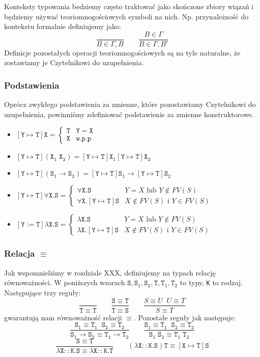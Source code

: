 \documentclass[11pt,leqno]{article}
\begin{document}
Konteksty typowania bedziemy często traktować jako skończone zbiory wiązań i będziemy
używać teoriomnogościowych symboli na nich. Np. przynależność do kontekstu formalnie
definiujemy jako:
\[
	\frac{}{B \in \Gamma,B}
	\qquad
	\frac{B \in \Gamma}{B \in \Gamma,B'}
\]
Definicje pozostałych operacji teoriomnogościowych są na tyle naturalne, że zostawiamy
je Czytelnikowi do uzupełnienia.


\subsubsection{Podstawienia}
Oprócz zwykłego podstawienia za zmienne, które pozostawiamy Czytelnikowi do uzupełnienia, powinniśmy zdefiniować podstawienie za zmienne konstruktorowe.

    \begin{itemize}
        \item $\mathtt{[Y \mapsto T]X = \begin{cases}  \texttt{T} & Y=X \\ \texttt{X} & \text{w.p.p} \end{cases}}$
        \item $\mathtt{[Y \mapsto T](X_1 \; X_2)  = [Y \mapsto T]X_1 [Y \mapsto T] X_2 }$
        \item $\mathtt{[Y \mapsto T](S_1 \rightarrow S_2) = [Y \mapsto T]S_1 \rightarrow [Y \mapsto T]S_2} $
        \item $\mathtt{[Y \mapsto T]\forall X.S}  = \begin{cases} \mathtt{\forall X.S} & Y=X \text{ lub } Y \notin FV(S) \\ \mathtt{\forall X.[Y \mapsto T]S} & X \notin FV(S)  \text{ i } Y \in FV(S) \end{cases}$
        \item $\mathtt{[Y := T]\lambda X.S }= \begin{cases} \mathtt{\lambda X.S} & Y=X \text{ lub } Y \notin FV(S)\\ \mathtt{\lambda X.[Y \mapsto T]S}  & X \notin FV(S)  \text{ i } Y \in FV(S) \end{cases}$
    \end{itemize}

\subsubsection{Relacja $\equiv$}

Jak wspomnieliśmy w rozdziale XXX, definiujemy na typach relację równoważności. W poniższych wzorach $\mathtt{S,S_1,S_2,T,T_1,T_2}$ to typy, \texttt{K} to rodzaj. Następujące trzy reguły:
	\[\mathtt{
		\frac{}{T \equiv T}
                \qquad
                \frac{S \equiv T}{T \equiv S}}
                \qquad
                \frac{S \equiv U \;\; U \equiv T}{S \equiv T}
	\]
gwarantują nam równoważność relacji $\equiv$. Pozostałe reguły jak następuje:
	\[\mathtt{
		\frac{S_1 \equiv T_1 \;\; S_2 \equiv T_2}{S_1 \rightarrow S_2 \equiv T_1 \rightarrow T_2}
                \qquad
                \frac{S_1 \equiv T_1 \;\; S_2 \equiv T_2}{S_1\;S_2 \equiv T_1\;T_2}}
	\]
	\[\mathtt{
		\frac{S \equiv T}{\lambda X::K.S \equiv \lambda X::K.T}
                \qquad
                (\lambda X::K.S)T \equiv [X \mapsto T]S}
	\] 
\end{document}
